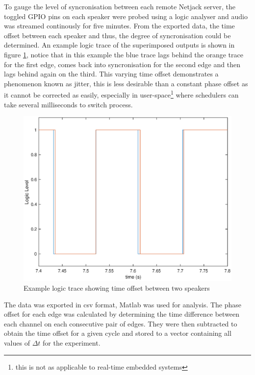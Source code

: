 \documentclass[main.tex]{subfiles}
\begin{document}
\medskip
To gauge the level of syncronisation between each remote Netjack server, the toggled GPIO pins on each speaker were probed using a logic analyser and audio was streamed continously for five minutes.
From the exported data, the time offset between each speaker and thus, the degree of syncronisation could be determined.
An example logic trace of the superimposed outputs is shown in figure \ref{fig:phase-offset}, notice that in this example the blue trace lags behind the orange trace for the first edge, comes back into syncronisation for the second edge and then lags behind again on the third.
This varying time offset demonstrates a phenomenon known as jitter, this is less desirable than a constant phase offset as it cannot be corrected as easily, especially in user-space\footnote{this is not as applicable to real-time embedded systems} where schedulers can take several milliseconds to switch process.

\begin{figure}[H]
    \centering
    \includegraphics[scale=0.75]{./figs/phase-offset.eps}        
    \caption{Example logic trace showing time offset between two speakers}
    \label{fig:phase-offset}
\end{figure}

The data was exported in csv format, Matlab was used for analysis.
The phase offset for each edge was calculated by determining the time difference between each channel on each consecutive pair of edges.
They were then subtracted to obtain the time offset for a given cycle and stored to a vector containing all values of $\Delta t$ for the experiment.
\end{document}
